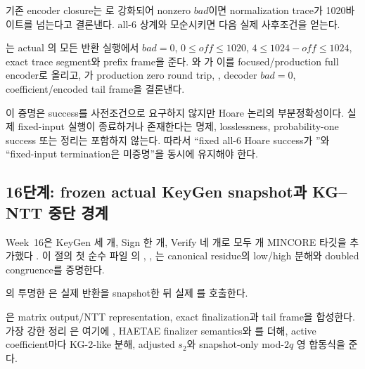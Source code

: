기존 encoder closure는
로 강화되어 nonzero
\(bad\)이면 normalization trace가 1020바이트를 넘는다고 결론낸다. all-6
상계와 모순시키면 다음 실제 사후조건을 얻는다.

\begin{verified}
는 actual
의 모든 반환 실행에서 \(bad=0\),
\(0\le off\le1020\), \(4\le1024-off\le1024\), exact trace segment와 prefix
frame을 준다. 와
가 이를 focused/production
full encoder로 올리고,
가 production zero
round trip, , decoder \(bad=0\), coefficient/encoded
tail frame을 결론낸다.
\end{verified}

이 증명은 success를 사전조건으로 요구하지 않지만 Hoare 논리의
부분정확성이다. 실제 fixed-input 실행이 종료하거나 존재한다는 명제,
losslessness, probability-one success 또는  정리는 포함하지
않는다. 따라서 ``fixed all-6 Hoare success가 \statusproved''와 ``fixed-input
termination은 미증명''을 동시에 유지해야 한다.

\subsection{16단계: frozen actual KeyGen snapshot과 KG--NTT 중단 경계}

Week~16은 KeyGen 세 개, Sign 한 개, Verify 네 개로 모두
\WeekSixteenTargetCount 개 MINCORE 타깃을 추가했다
\cite{week16-mincore-plan,week16-kg-report,week16-kg-ntt-mul-report,
week16-sign-report,week16-verify-report}. 이 절의 첫 순수 파일
%
\allowbreak{}의
,
,
는 canonical
residue의 low/high 분해와 doubled congruence를 증명한다.

의 투명한
은 실제
 반환을 snapshot한 뒤 실제
를 호출한다.

\begin{verified}
은 matrix output/NTT
representation, exact finalization과 tail frame을 합성한다. 가장 강한 정리
은 여기에
, HAETAE finalizer
semantics와 를 더해,
active coefficient마다 KG-2-like 분해, adjusted \(s_2\)와 snapshot-only
mod-\(2q\) 영 합동식을 준다.
\end{verified}

